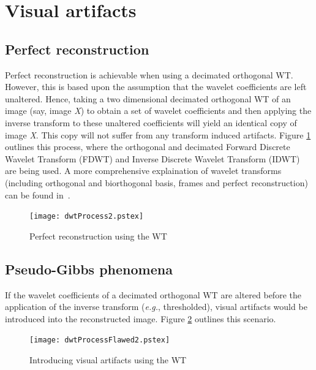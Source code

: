 \documentclass[12pt]{report}
\begin{document}
\section{Visual artifacts}
\label{sec:PG}
\subsection{Perfect reconstruction}
\label{perfectReconstruction}
Perfect reconstruction is achievable when using a decimated
orthogonal WT. However, this is based upon the assumption 
that the wavelet coefficients are left unaltered. Hence, taking 
a two dimensional decimated orthogonal WT of an image
(say, image \emph{X}) to obtain a set of wavelet coefficients and then applying 
the inverse
transform to these unaltered coefficients will yield 
an identical copy of image \emph{X}. 
This copy will not suffer from any transform induced artifacts. 
Figure \ref{dwtProcess} outlines this process, where the orthogonal and 
decimated Forward Discrete Wavelet Transform (FDWT) and Inverse Discrete Wavelet Transform (IDWT)
are being used.
A more comprehensive explaination of wavelet transforms (including orthogonal and biorthogonal basis,
frames and perfect reconstruction)
can be found in~\cite{mallatAndyWav}.
\vspace{0.4cm}
\begin{figure}[htb]
	\begin{center}
	\texttt{[image: dwtProcess2.pstex]}
	\caption{Perfect reconstruction using the WT} 
	\label{dwtProcess}
	\end{center}
\end{figure}

\subsection{Pseudo-Gibbs phenomena}
\label{pseudoGibbsSection}
If the wavelet coefficients of a decimated orthogonal WT are altered
before the application of the inverse transform (\emph{e.g.}, thresholded), visual artifacts would be introduced into the 
reconstructed image. Figure \ref{dwtProcessFlawed} outlines this scenario.
\vspace{0.4cm}
\begin{figure}[htb]
	\begin{center}
        \texttt{[image: dwtProcessFlawed2.pstex]}
	\caption{Introducing visual artifacts using the WT}
        \label{dwtProcessFlawed}
	\end{center}
\end{figure}
\end{document}
